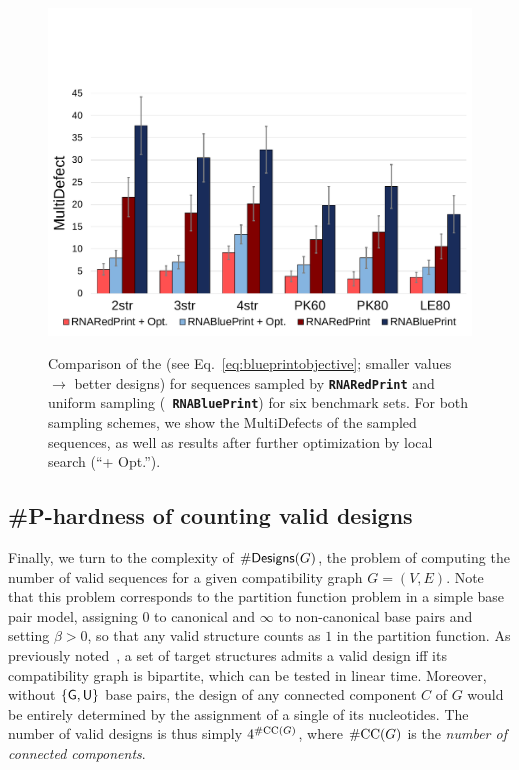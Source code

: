 \documentclass{bmcart}
\newcommand{\real}{\mathbb{R}}
\newcommand{\Def}[1]{\emph{#1}}
\newcommand{\Obj}{\text{\rm MultiDefect}}
\newcommand{\NumDesign}{\ensuremath{\#}{\sf Designs}\xspace}
\newcommand{\Nuc}[1]{{\sf #1}}
\newcommand{\Gb}{\Nuc{G}}
\newcommand{\Ub}{\Nuc{U}}
\newcommand{\RNAblueprint}{{\tt \bfseries{}\color{black!85} RNA\textcolor{blue!70!black}{Blue}Print}}
\newcommand{\ourprog}{{\tt \bfseries{}\color{black!85}RNA\textcolor{red!70!black}{Red}Print}}
\newcommand{\citep}[1]{\cite{#1}}
\begin{document}
\begin{figure}
  {\includegraphics[width=.9\linewidth,trim={.2cm .3cm .2cm 5cm},clip]{Figs/statistics-overall}}
  \caption{Comparison of the \Obj{} (see
    Eq.~\eqref{eq:blueprintobjective}; smaller values $\to$ better
    designs) for sequences sampled by \ourprog{} and uniform sampling
    (\RNAblueprint) for six benchmark sets. For both sampling schemes,
    we show the MultiDefects of the sampled sequences, as well as
    results after further optimization by local search (``+ Opt.'').}
\label{fig:benchmark-results}
\end{figure}

\subsection*{\#{\sf P}-hardness of counting valid designs}\label{sec:counting}
Finally, we turn to the complexity of $\NumDesign(G)$, the problem of
computing the number of valid sequences for a given compatibility
graph $G=(V,E)$. Note that this problem corresponds to the partition
function problem in a simple base pair model, assigning $0$ to
canonical and $\infty$ to non-canonical base pairs and setting
$\beta>0$, so that any valid structure counts as $1$ in the partition
function. As previously noted~\citep{Flamm2001}, a set of target
structures admits a valid design iff its compatibility graph is
bipartite, which can be tested in linear time.  Moreover, without
$\{\Gb, \Ub\}$ base pairs, the design of any connected component $C$
of $G$ would be entirely determined by the assignment of a single of
its nucleotides. The number of valid designs is thus simply
$4^{\#{\rm CC}(G)}$, where $\#{\rm CC}(G)$ is the \Def{number of
  connected components}.
\end{document}
